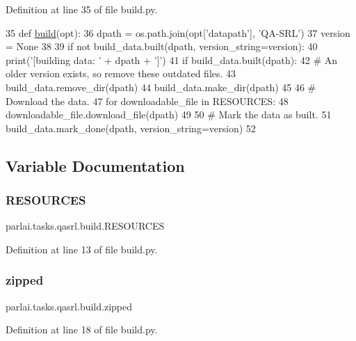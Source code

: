 Definition at line 35 of file build.\+py.


\begin{DoxyCode}
35 \textcolor{keyword}{def }\hyperlink{namespacedialog__babi__feedback_1_1build_a7a9d289f7493a5ded13c4b7f071b6184}{build}(opt):
36     dpath = os.path.join(opt[\textcolor{stringliteral}{'datapath'}], \textcolor{stringliteral}{'QA-SRL'})
37     version = \textcolor{keywordtype}{None}
38 
39     \textcolor{keywordflow}{if} \textcolor{keywordflow}{not} build\_data.built(dpath, version\_string=version):
40         print(\textcolor{stringliteral}{'[building data: '} + dpath + \textcolor{stringliteral}{']'})
41         \textcolor{keywordflow}{if} build\_data.built(dpath):
42             \textcolor{comment}{# An older version exists, so remove these outdated files.}
43             build\_data.remove\_dir(dpath)
44         build\_data.make\_dir(dpath)
45 
46         \textcolor{comment}{# Download the data.}
47         \textcolor{keywordflow}{for} downloadable\_file \textcolor{keywordflow}{in} RESOURCES:
48             downloadable\_file.download\_file(dpath)
49 
50         \textcolor{comment}{# Mark the data as built.}
51         build\_data.mark\_done(dpath, version\_string=version)
52 \end{DoxyCode}


\subsection{Variable Documentation}
\mbox{\label{namespaceparlai_1_1tasks_1_1qasrl_1_1build_a04e7b9e28ecdcb659118ff07cffbef7a}} 
\subsubsection{\texorpdfstring{R\+E\+S\+O\+U\+R\+C\+ES}{RESOURCES}}
{\footnotesize\ttfamily parlai.\+tasks.\+qasrl.\+build.\+R\+E\+S\+O\+U\+R\+C\+ES}



Definition at line 13 of file build.\+py.

\mbox{\label{namespaceparlai_1_1tasks_1_1qasrl_1_1build_aa4f2e0d96fec9dd5f644823f78375fc4}} 
\subsubsection{\texorpdfstring{zipped}{zipped}}
{\footnotesize\ttfamily parlai.\+tasks.\+qasrl.\+build.\+zipped}



Definition at line 18 of file build.\+py.

